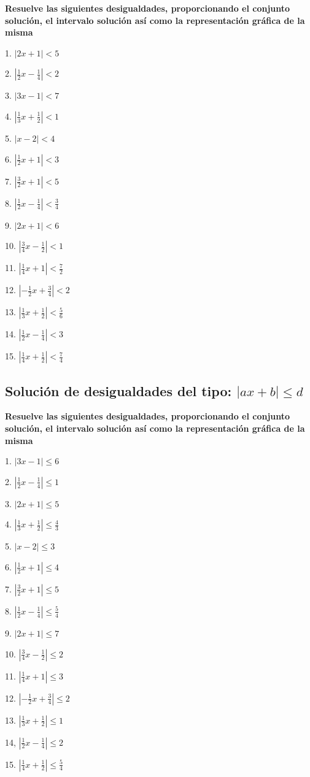 \documentclass[]{book}
\begin{document}
\textbf{Resuelve las siguientes desigualdades, proporcionando el
conjunto solución, el intervalo solución así como la representación
gráfica de la misma}

\begin{multicols}{3}
1. $|2x+1|<5$

2. $|\frac{1}{2}x-\frac{1}{4}|<2$

3. $|3x-1|<7$

4. $|\frac{1}{3}x+\frac{1}{2}|<1$

5. $|x-2|<4$

6. $|\frac{1}{2}x+1|<3$

7. $|\frac{3}{2}x+1|<5$

8. $|\frac{1}{2}x-\frac{1}{4}|<\frac{3}{4}$

9. $|2x+1|<6$

10. $|\frac{3}{4}x-\frac{1}{2}|<1$

11. $|\frac{1}{4}x+1|<\frac{7}{2}$

12. $|-\frac{1}{2}x+\frac{3}{4}|<2$

13. $|\frac{1}{3}x+\frac{1}{2}|<\frac{5}{6}$

14. $|\frac{1}{2}x-\frac{1}{4}|<3$

15. $|\frac{1}{4}x+\frac{1}{2}|<\frac{7}{4}$
\end{multicols}

\subsection{\texorpdfstring{Solución de desigualdades del tipo:
\(|ax+b| \leq d\)}{Solución de desigualdades del tipo: \textbar{}ax+b\textbar{} \textbackslash{}leq d}}\label{soluciuxf3n-de-desigualdades-del-tipo-axb-leq-d}

\textbf{Resuelve las siguientes desigualdades, proporcionando el
conjunto solución, el intervalo solución así como la representación
gráfica de la misma}

\begin{multicols}{3}
1. $|3x-1|\leq 6$

2. $|\frac{1}{2}x-\frac{1}{4}|\leq 1$

3. $|2x+1|\leq 5$

4. $|\frac{1}{3}x+\frac{1}{2}|\leq \frac{4}{3}$

5. $|x-2|\leq 3$

6. $|\frac{1}{2}x+1|\leq 4$

7. $|\frac{3}{2}x+1|\leq 5$

8. $|\frac{1}{2}x-\frac{1}{4}|\leq \frac{5}{4}$

9. $|2x+1|\leq 7$

10. $|\frac{3}{4}x-\frac{1}{2}|\leq 2$

11. $|\frac{1}{4}x+1|\leq 3$

12. $|-\frac{1}{2}x+\frac{3}{4}|\leq 2$

13. $|\frac{1}{3}x+\frac{1}{2}|\leq 1$

14, $|\frac{1}{2}x-\frac{1}{4}|\leq 2$

15. $|\frac{1}{4}x+\frac{1}{2}|\leq \frac{5}{4}$
\end{multicols}
\end{document}
